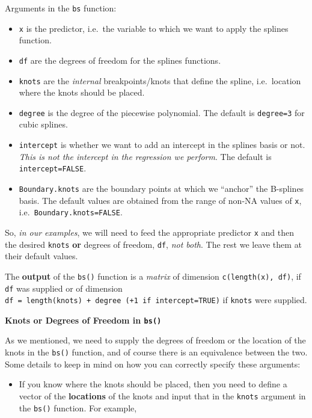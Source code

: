 \documentclass[
]{book}
\providecommand{\tightlist}{%
  \setlength{\itemsep}{0pt}\setlength{\parskip}{0pt}}
\begin{document}
Arguments in the \texttt{bs} function:

\begin{itemize}
\item
  \texttt{x} is the predictor, i.e.~the variable to which we want to apply the splines function.
\item
  \texttt{df} are the degrees of freedom for the splines functions.
\item
  \texttt{knots} are the \emph{internal} breakpoints/knots that define the spline, i.e.~location where the knots should be placed.
\item
  \texttt{degree} is the degree of the piecewise polynomial. The default is \texttt{degree=3} for cubic splines.
\item
  \texttt{intercept} is whether we want to add an intercept in the splines basis or not. \emph{This is not the intercept in the regression we perform}. The default is \texttt{intercept=FALSE}.
\item
  \texttt{Boundary.knots} are the boundary points at which we ``anchor'' the B-splines basis. The default values are obtained from the range of non-NA values of \texttt{x}, i.e.~\texttt{Boundary.knots=FALSE}.
\end{itemize}

So, \emph{in our examples}, we will need to feed the appropriate predictor \texttt{x} and then the desired \texttt{knots} \textbf{or} degrees of freedom, \texttt{df}, \emph{not both}. The rest we leave them at their default values.

The \textbf{output} of the \texttt{bs()} function is a \emph{matrix} of dimension \texttt{c(length(x),\ df)}, if \texttt{df} was supplied or of dimension \texttt{df\ =\ length(knots)\ +\ degree\ (+1\ if\ intercept=TRUE)} if \texttt{knots} were supplied.

\textbf{Knots or Degrees of Freedom in \texttt{bs()}}

As we mentioned, we need to supply the degrees of freedom or the location of the knots in the \texttt{bs()} function, and of course there is an equivalence between the two. Some details to keep in mind on how you can correctly specify these arguments:

\begin{itemize}
\tightlist
\item
  If you know where the knots should be placed, then you need to define a vector of the \textbf{locations} of the knots and input that in the \texttt{knots} argument in the \texttt{bs()} function. For example,
\end{itemize}
\end{document}
